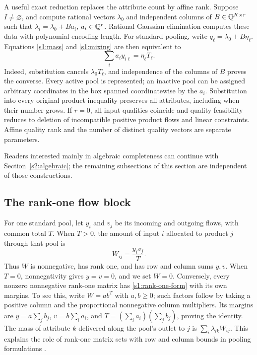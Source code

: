 A useful exact reduction replaces the attribute count by affine rank.
Suppose $I\ne\varnothing$, and compute rational vectors $\lambda_0$ and
independent columns of $B\in\mathbb Q^{K\times r}$ such that
$\lambda_i=\lambda_0+Ba_i$, $a_i\in\mathbb Q^r$. Rational Gaussian elimination
computes these data with polynomial encoding length. For standard
pooling, write $q_\ell=\lambda_0+B\eta_\ell$. Equations
\eqref{s1:mass} and \eqref{s1:mixing} are then equivalent to
\begin{equation}
 \sum_i a_i y_{i\ell}=\eta_\ell T_\ell.\label{s1:rank-coordinate}
\end{equation}
Indeed, substitution cancels $\lambda_0T_\ell$, and independence of the
columns of $B$ proves the converse. Every active pool is represented;
an inactive pool can be assigned arbitrary coordinates in the box spanned
coordinatewise by the $a_i$. Substitution into every original product
inequality preserves all attributes, including when their number grows.
If $r=0$, all input qualities coincide and quality feasibility reduces
to deletion of incompatible positive product flows and linear constraints.
Affine quality rank and the number of distinct quality vectors are
separate parameters.

Readers interested mainly in algebraic completeness can continue with
Section~\ref{s2:algebraic}; the remaining subsections of this section
are independent of those constructions.

\subsection{The rank-one flow block}\label{s1:rank-one}

For one standard pool, let $y_i$ and $v_j$ be its incoming and outgoing
flows, with common total $T$. When $T>0$, the amount of input $i$
allocated to product $j$ through that pool is
\begin{equation}
 W_{ij}=\frac{y_iv_j}{T}.\label{s1:rank-one-form}
\end{equation}
Thus $W$ is nonnegative, has rank one, and has row and column sums $y,v$.
When $T=0$, nonnegativity gives $y=v=0$, and we set $W=0$.
Conversely, every nonzero nonnegative rank-one matrix has
\eqref{s1:rank-one-form} with its own margins. To see this, write
$W=ab^T$ with $a,b\ge0$; such factors follow by taking a positive column
and the proportional nonnegative column multipliers. Its margins are
$y=a\sum_jb_j$, $v=b\sum_i a_i$, and
$T=(\sum_i a_i)(\sum_jb_j)$, proving the identity.
The mass of attribute $k$ delivered along the pool's outlet to $j$ is
$\sum_i\lambda_{ik}W_{ij}$. This explains the role of rank-one matrix
sets with row and column bounds in pooling formulations
\citep{dey2020-convexifications-of-rank-one-based}.

